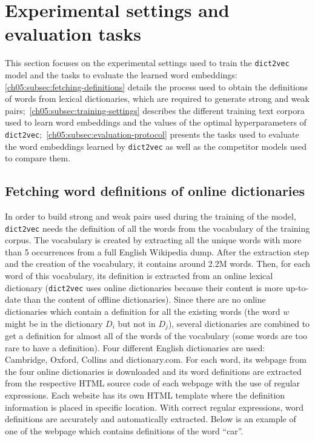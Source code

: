 \section{Experimental settings and evaluation tasks}
  \label{ch05:sec:experimental-settings}
  This section focuses on the experimental settings used to train the
  \texttt{dict2vec} model and the tasks to evaluate the learned word embeddings:
  \autoref{ch05:subsec:fetching-definitions} details the process used to obtain
  the definitions of words from lexical dictionaries, which are required to
  generate strong and weak pairs;~\autoref{ch05:subsec:training-settings}
  describes the different training text corpora used to learn word embeddings
  and the values of the optimal hyperparameters of
  \texttt{dict2vec};~\autoref{ch05:subsec:evaluation-protocol} presents the
  tasks used to evaluate the word embeddings learned by \texttt{dict2vec} as
  well as the competitor models used to compare them.

  \subsection{Fetching word definitions of online dictionaries}
    \label{ch05:subsec:fetching-definitions}
    In order to build strong and weak pairs used during the training of the
    model, \texttt{dict2vec} needs the definition of all the words from the
    vocabulary of the training corpus. The vocabulary is created by extracting
    all the unique words with more than 5 occurrences from a full English
    Wikipedia dump. After the extraction step and the creation of the
    vocabulary, it contains around 2.2M words. Then, for each word of this
    vocabulary, its definition is extracted from an online lexical dictionary
    (\texttt{dict2vec} uses online dictionaries because their content is more
    up-to-date than the content of offline dictionaries). Since there are no
    online dictionaries which contain a definition for all the existing words
    (the word $w$ might be in the dictionary $D_i$ but not in $D_j$), several
    dictionaries are combined to get a definition for almost all of the words of
    the vocabulary (some words are too rare to have a definition). Four
    different English dictionaries are used: Cambridge, Oxford, Collins and
    dictionary.com. For each word, its webpage from the four online dictionaries
    is downloaded and its word definitions are extracted from the respective
    HTML source code of each webpage with the use of regular expressions. Each
    website has its own HTML template where the definition information is placed
    in specific location. With correct regular expressions, word definitions are
    accurately and automatically extracted. Below is an example of one of the
    webpage which contains definitions of the word ``car''.

